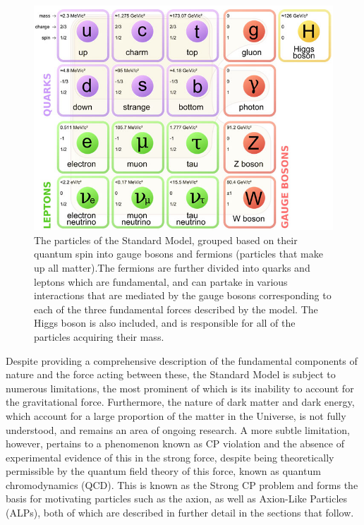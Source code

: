 \\
\begin{figure}[H]
    \centering
    \includegraphics[scale = 0.4]{StandardModel.jpg}
    \caption{The particles of the Standard Model, grouped based on their quantum spin into gauge bosons and fermions (particles that make up all matter).The fermions are further divided into quarks and leptons which are fundamental, and can partake in various interactions that are mediated by the gauge bosons corresponding to each of the three fundamental forces described by the model. The Higgs boson is also included, and is responsible for all of the particles acquiring their mass.}
    \label{StandardModel}
\end{figure}
Despite providing a comprehensive description of the fundamental components of nature and the force acting between these, the Standard Model is subject to numerous limitations, the most prominent of which is its inability to account for the gravitational force. Furthermore, the nature of dark matter and dark energy, which account for
a large proportion of the matter in the Universe, is not fully understood, and remains an area of ongoing research. A more subtle limitation, however, pertains to a phenomenon known as CP violation and the absence of experimental evidence of this in the strong force, despite being theoretically permissible by the quantum field theory of this force,
known as quantum chromodynamics (QCD). This is known as the Strong CP problem and forms the basis for motivating particles such as the axion, as well as Axion-Like Particles (ALPs), both of which are described in further detail in the sections that follow.
